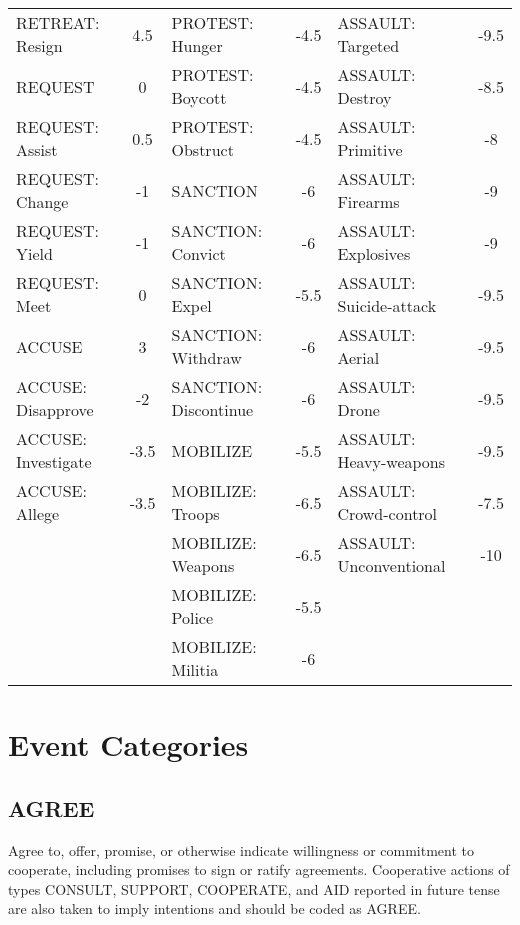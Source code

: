 \documentclass[11pt]{report}
\newcommand{\plcat}[1]{\textsf{#1}}
\begin{document}
\begin{table}[htp]
\begin{center}
\begin{tabular}{|lc|lc|lc|}
RETREAT: Resign	&	4.5	&	PROTEST: Hunger	&	-4.5	&	ASSAULT: Targeted	&	-9.5 \\
\cellcolor{gray!25}REQUEST	& \cellcolor{gray!25}0 &PROTEST: Boycott	&	-4.5	&	ASSAULT: Destroy	&	-8.5 \\	
REQUEST: Assist	&	0.5	&	PROTEST: Obstruct	&	-4.5		&	ASSAULT: Primitive	&	-8 \\
REQUEST: Change	&	-1	&	\cellcolor{gray!25}SANCTION	&	\cellcolor{gray!25}-6		&	ASSAULT: Firearms	&	-9 \\
REQUEST: Yield	&	-1	&	SANCTION: Convict	&	-6	&	ASSAULT: Explosives	&	-9 \\
REQUEST: Meet	&	0	&		SANCTION: Expel	&	-5.5	&	ASSAULT: Suicide-attack	&	-9.5 \\
\cellcolor{gray!25}ACCUSE	& \cellcolor{gray!25}3&	SANCTION: Withdraw	&	-6		&	ASSAULT: Aerial	&	-9.5 \\
ACCUSE: Disapprove	&	-2	&	SANCTION: Discontinue	&	-6	&	ASSAULT: Drone	&	-9.5 \\
ACCUSE: Investigate	&	-3.5	&	\cellcolor{gray!25}MOBILIZE	&	\cellcolor{gray!25}-5.5	&	ASSAULT: Heavy-weapons	&	-9.5 \\
ACCUSE: Allege	&	-3.5	&	MOBILIZE: Troops	&	-6.5	&	ASSAULT: Crowd-control	&	-7.5 \\
	&		&	MOBILIZE: Weapons	&	-6.5	&	ASSAULT: Unconventional	&	-10 \\
	&		&	MOBILIZE: Police	&	-5.5	&	&\\
	&		&	MOBILIZE: Militia	&	-6	& &\\
\hline
\end{tabular}
\end{center}
\label{tab:ploverscores}
\end{table}

\chapter{Event Categories}

\section{AGREE}


Agree to, offer, promise, or otherwise indicate willingness or commitment to cooperate, including promises to sign or ratify agreements.  Cooperative actions of types \plcat{CONSULT}, \plcat{SUPPORT}, \plcat{COOPERATE}, and \plcat{AID} reported in future tense are also taken to imply intentions and should be coded as \plcat{AGREE}.
\end{document}
